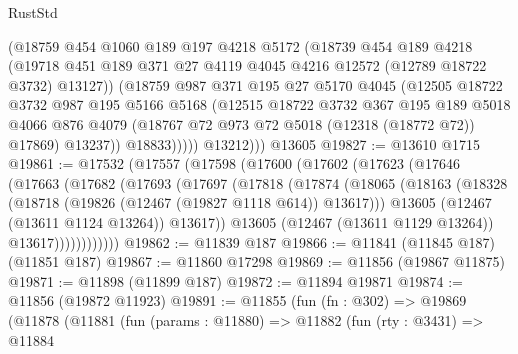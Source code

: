 \begin{lexlean}{RustStd}
\begin{coremodule}
                (@18759
                  @454
                  @1060
                  @189
                  @197
                  @4218
                  @5172
                  (@18739
                    @454
                    @189
                    @4218
                    (@19718
                      @451
                      @189
                      @371
                      @27
                      @4119
                      @4045
                      @4216
                      @12572
                      (@12789 @18722 @3732)
                      @13127))
                  (@18759
                    @987
                    @371
                    @195
                    @27
                    @5170
                    @4045
                    (@12505
                      @18722
                      @3732
                      @987
                      @195
                      @5166
                      @5168
                      (@12515
                        @18722
                        @3732
                        @367
                        @195
                        @189
                        @5018
                        @4066
                        @876
                        @4079
                        (@18767 @72 @973 @72 @5018 (@12318 (@18772 @72)) @17869)
                        @13237))
                    @18833)))))
          @13212)))
    @13605
@19827 := @13610 @1715
@19861 := @17532
    (@17557
      (@17598
        (@17600
          (@17602
            (@17623
              (@17646
                (@17663
                  (@17682
                    (@17693
                      (@17697
                        (@17818
                          (@17874
                            (@18065
                              (@18163
                                (@18328 (@18718 (@19826 (@12467 (@19827 @1118 @614)) @13617)))
                                @13605
                                (@12467 (@13611 @1124 @13264))
                                @13617))
                            @13605
                            (@12467 (@13611 @1129 @13264))
                            @13617))))))))))))
@19862 := @11839 @187
@19866 := @11841 (@11845 @187) (@11851 @187)
@19867 := @11860 @17298
@19869 := @11856 (@19867 @11875)
@19871 := @11898 (@11899 @187)
@19872 := @11894 @19871
@19874 := @11856 (@19872 @11923)
@19891 := @11855
    (fun (fn : @302) =>
    @19869
      (@11878
        (@11881
          (fun (params : @11880) =>
          @11882
            (fun (rty : @3431) =>
            @11884

\end{coremodule}
\end{lexlean}
